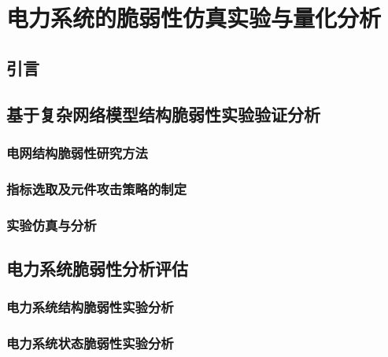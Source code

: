 \chapter{电力系统的脆弱性仿真实验与量化分析}
\label{cha:quantiAnaly}

\section{引言}
\label{sec:index5}




\section{基于复杂网络模型结构脆弱性实验验证分析}
\label{sec:modelIntroduce}



\subsection{电网结构脆弱性研究方法}
\label{sec:modelIntroduce}





\subsection{指标选取及元件攻击策略的制定}
\label{sec:modelIntroduce}




\subsection{实验仿真与分析}
\label{sec:modelIntroduce}



\section{电力系统脆弱性分析评估}
\label{sec:singleAssessment}




\subsection{电力系统结构脆弱性实验分析}
\label{sec:singleAnalysis_fabric}




\subsection{电力系统状态脆弱性实验分析}
\label{sec:singleAnalysis_status}





